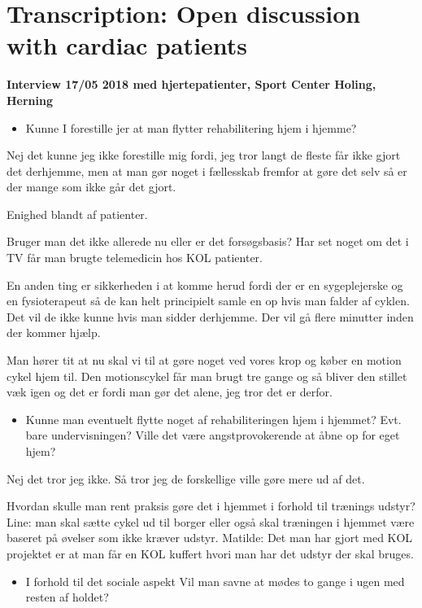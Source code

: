 \chapter{Transcription: Open discussion with cardiac patients} \label{open}

\textbf{Interview 17/05 2018 med hjertepatienter, Sport Center Holing, Herning}  

\begin{itemize}
	\item Kunne I forestille jer at man flytter rehabilitering hjem i hjemme?
\end{itemize}
 Nej det kunne jeg ikke forestille mig fordi, jeg tror langt de fleste får ikke gjort det derhjemme, men at man gør noget i fællesskab fremfor at gøre det selv så er der mange som ikke går det gjort. 

Enighed blandt af patienter. 

Bruger man det ikke allerede nu eller er det forsøgsbasis? Har set noget om det i TV får man brugte telemedicin hos KOL patienter. 

En anden ting er sikkerheden i at komme herud fordi der er en sygeplejerske og en fysioterapeut så de kan helt principielt samle en op hvis man falder af cyklen. Det vil de ikke kunne hvis man sidder derhjemme. Der vil gå flere minutter inden der kommer hjælp. 

Man hører tit at nu skal vi til at gøre noget ved vores krop og køber en motion cykel hjem til. Den motionscykel får man brugt tre gange og så bliver den stillet væk igen og det er fordi man gør det alene, jeg tror det er derfor. 

\begin{itemize}
	\item Kunne man eventuelt flytte noget af rehabiliteringen hjem i hjemmet? Evt. bare undervisningen? Ville det være angstprovokerende at åbne op for eget hjem? 
\end{itemize}
Nej det tror jeg ikke. Så tror jeg de forskellige ville gøre mere ud af det. 

Hvordan skulle man rent praksis gøre det i hjemmet i forhold til trænings udstyr? 
Line: man skal sætte cykel ud til borger eller også skal træningen i hjemmet være baseret på øvelser som ikke kræver udstyr. Matilde: Det man har gjort med KOL projektet er at man får en KOL kuffert hvori man har det udstyr der skal bruges. 

\begin{itemize}
	\item I forhold til det sociale aspekt Vil man savne at mødes to gange i ugen med resten af holdet?
\end{itemize}

